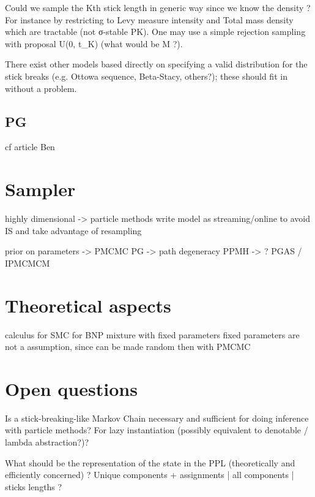 Could we sample the Kth stick length in generic way since we know the density ? For instance by restricting to Levy measure intensity and Total mass density which are tractable (not σ-stable PK). One may use a simple rejection sampling with proposal U(0, t_K) (what would be M ?).

There exist other models based directly on specifying a valid distribution for the stick breaks (e.g. Ottowa sequence, Beta-Stacy, others?); these should fit in without a problem.

\subsection{PG}
cf article Ben

\section{Sampler}

highly dimensional -> particle methods
write model as streaming/online to avoid IS and take advantage of resampling

prior on parameters -> PMCMC
PG -> path degeneracy
PPMH -> ?
PGAS / IPMCMCM

\section{Theoretical aspects}
calculus for SMC for BNP mixture with fixed parameters
fixed parameters are not a assumption, since can be made random then with PMCMC

\section{Open questions}
Is a stick-breaking-like Markov Chain necessary and sufficient for doing inference with particle methods? For lazy instantiation (possibly equivalent to denotable / lambda abstraction?)?

What should be the representation of the state in the PPL (theoretically and efficiently concerned) ? Unique components + assignments | all components | sticks lengths ?   
